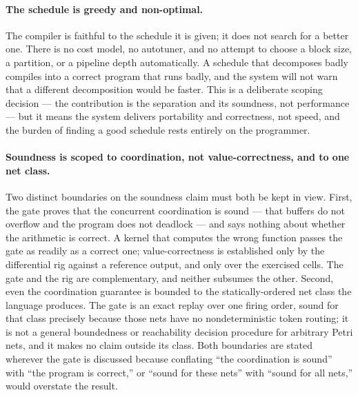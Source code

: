 \paragraph{The schedule is greedy and non-optimal.} The compiler is faithful to
the schedule it is given; it does not search for a better one. There is no cost
model, no autotuner, and no attempt to choose a block size, a partition, or a
pipeline depth automatically. A schedule that decomposes badly compiles into a
correct program that runs badly, and the system will not warn that a different
decomposition would be faster. This is a deliberate scoping decision --- the
contribution is the separation and its soundness, not performance --- but it means
the system delivers portability and correctness, not speed, and the burden of
finding a good schedule rests entirely on the programmer.

\paragraph{Soundness is scoped to coordination, not value-correctness, and to one
net class.} Two distinct boundaries on the soundness claim must both be kept in
view. First, the gate proves that the concurrent coordination is sound --- that
buffers do not overflow and the program does not deadlock --- and says nothing
about whether the arithmetic is correct. A kernel that computes the wrong function
passes the gate as readily as a correct one; value-correctness is established only
by the differential rig against a reference output, and only over the exercised
cells. The gate and the rig are complementary, and neither subsumes the other.
Second, even the coordination guarantee is bounded to the statically-ordered net
class the language produces. The gate is an exact replay over one firing order,
sound for that class precisely because those nets have no nondeterministic token
routing; it is not a general boundedness or reachability decision procedure for
arbitrary Petri nets, and it makes no claim outside its class. Both boundaries are
stated wherever the gate is discussed because conflating ``the coordination is
sound'' with ``the program is correct,'' or ``sound for these nets'' with ``sound
for all nets,'' would overstate the result.

